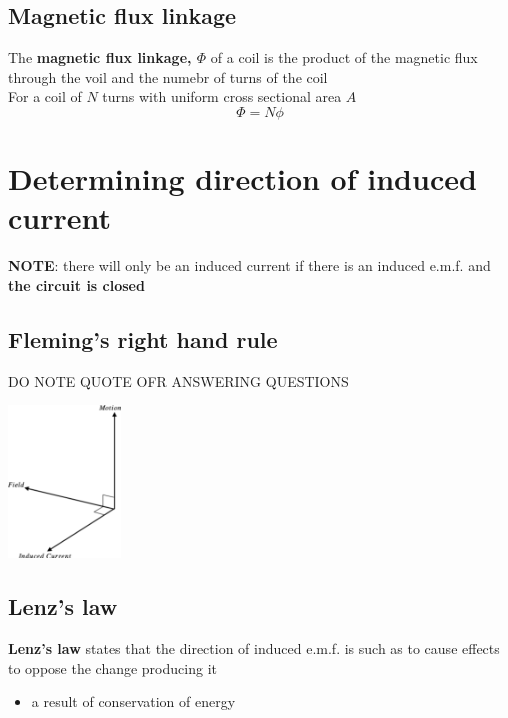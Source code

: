 \documentclass[a4paper, 10pt]{article}
\begin{document}
\subsection{Magnetic flux linkage}
\begin{framed}
   The \textbf{magnetic flux linkage, $\Phi$ } of a coil is the product of the magnetic flux through the voil and the numebr of turns of the coil \\

   For a coil of $N$ turns with uniform cross sectional area $A$ 
   \[
   \Phi = N \phi
   \]
\end{framed}


\section{Determining direction of induced current}
\textbf{NOTE}: there will only be an induced current if there is an induced e.m.f. and \textbf{the circuit is closed}

\subsection{Fleming's right hand rule}
\begin{center}
DO NOTE QUOTE OFR ANSWERING QUESTIONS
\end{center}	

\begin{center}
   \includegraphics[width=3cm]{figures/2.pdf} 
\end{center}	


\subsection{Lenz's law}

\begin{framed}
   \textbf{Lenz's law} states that the direction of induced e.m.f. is such as to cause effects to oppose the change producing it
\end{framed}	
\begin{itemize}
   \item a result of conservation of energy
\end{itemize}	
\end{document}
